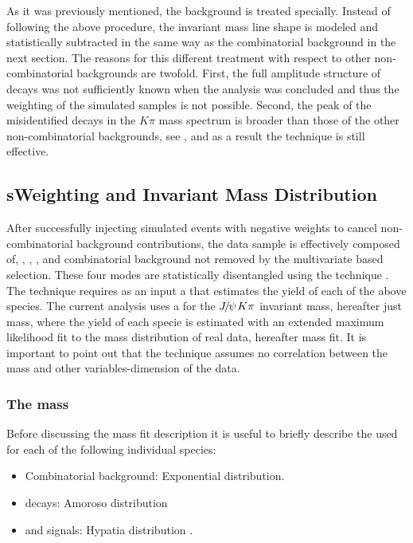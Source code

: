As it was previously mentioned, the \LbJpsippi background is treated specially. Instead of following the above
procedure, the \LbJpsippi invariant mass line shape is modeled and statistically subtracted in the same way as the
combinatorial background in the next section. The reasons for this different treatment with respect to other
non-combinatorial backgrounds are twofold. First, the full amplitude structure of \LbJpsippi decays was not
sufficiently known \cite{Aaij:2014zoa} when the analysis was concluded and thus the weighting of the simulated samples is not possible.
Second, the peak of the misidentified \LbJpsippi decays in the \jpsi$K\pi$ mass spectrum is broader than those
of the other non-combinatorial backgrounds, see , and as a result the \sPlot technique is still
effective.


\subsection{sWeighting and Invariant Mass Distribution}
\label{sWeighting_and_mass}

After successfully injecting simulated events with negative weights to cancel non-combinatorial background contributions,
the data sample is effectively composed of, \BdJpsiKpi, \BsJpsiKpi, \LbJpsippi, and combinatorial background not removed by the
multivariate based selection. These four modes are statistically disentangled using the \sPlot technique \cite{splot}.
The technique requires as an input a \pdf that estimates the yield of each of the above species. The current analysis uses
a \pdf for the ${J\mskip -3mu/\mskip -2mu\psi\mskip 2mu} K\pi$ invariant mass, hereafter just mass, where the yield of each specie is estimated with an extended
maximum likelihood fit to the mass distribution of real data, hereafter mass fit. It is important to point out that the \sPlot
technique assumes no correlation between the mass and other variables-dimension of the data.

\subsubsection{The mass \pdf}
Before discussing the mass fit description it is useful to briefly describe the \pdfs used for each of the following individual species:

\begin{itemize}
\item Combinatorial background: Exponential distribution.
\item \LbJpsippi decays: Amoroso distribution \cite{Amoroso}
\item \Bd and \Bs signals: Hypatia distribution \cite{Santos:2013gra}.
\end{itemize}

